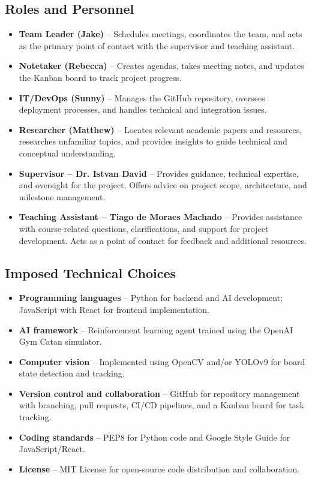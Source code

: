 \documentclass{article}
\begin{document}
\subsection{Roles and Personnel}\label{subsec:roles}
\begin{itemize}
    \item \textbf{Team Leader (Jake)} – Schedules meetings, coordinates the team, and acts as the primary point of contact with the supervisor and teaching assistant.
    \item \textbf{Notetaker (Rebecca)} – Creates agendas, takes meeting notes, and updates the Kanban board to track project progress.
    \item \textbf{IT/DevOps (Sunny)} – Manages the GitHub repository, oversees deployment processes, and handles technical and integration issues.
    \item \textbf{Researcher (Matthew)} – Locates relevant academic papers and resources, researches unfamiliar topics, and provides insights to guide technical and conceptual understanding.
    \item \textbf{Supervisor – Dr. Istvan David} – Provides guidance, technical expertise, and oversight for the project. Offers advice on project scope, architecture, and milestone management.
    \item \textbf{Teaching Assistant – Tiago de Moraes Machado} – Provides assistance with course-related questions, clarifications, and support for project development. Acts as a point of contact for feedback and additional resources.
\end{itemize}

\subsection{Imposed Technical Choices}\label{subsec:technicalchoices}
\begin{itemize}
    \item \textbf{Programming languages} – Python for backend and AI development; JavaScript with React for frontend implementation.
    \item \textbf{AI framework} – Reinforcement learning agent trained using the OpenAI Gym Catan simulator.
    \item \textbf{Computer vision} – Implemented using OpenCV and/or YOLOv9 for board state detection and tracking.
    \item \textbf{Version control and collaboration} – GitHub for repository management with branching, pull requests, CI/CD pipelines, and a Kanban board for task tracking.
    \item \textbf{Coding standards} – PEP8 for Python code and Google Style Guide for JavaScript/React.
    \item \textbf{License} – MIT License for open-source code distribution and collaboration.
\end{itemize}
\end{document}
